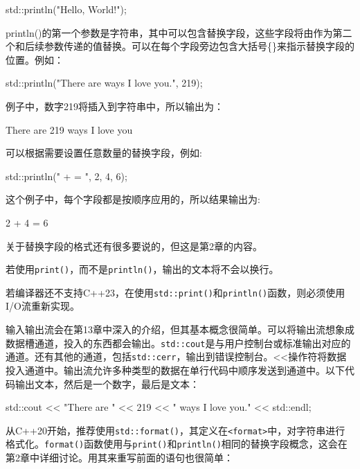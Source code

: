 \begin{cpp}
std::println("Hello, World!");
\end{cpp}

println()的第一个参数是字符串，其中可以包含替换字段，这些字段将由作为第二个和后续参数传递的值替换。可以在每个字段旁边包含大括号\{\}来指示替换字段的位置。例如：

\begin{cpp}
std::println("There are {} ways I love you.", 219);
\end{cpp}

例子中，数字219将插入到字符串中，所以输出为：

\begin{shell}
There are 219 ways I love you
\end{shell}

可以根据需要设置任意数量的替换字段，例如:

\begin{cpp}
std::println("{} + {} = {}", 2, 4, 6);
\end{cpp}

这个例子中，每个字段都是按顺序应用的，所以结果输出为:

\begin{shell}
2 + 4 = 6
\end{shell}

关于替换字段的格式还有很多要说的，但这是第2章的内容。

若使用\verb|print()|，而不是\verb|println()|，输出的文本将不会以换行。


若编译器还不支持C++23，在使用\verb|std::print()|和\verb|println()|函数，则必须使用I/O流重新实现。

输入输出流会在第13章中深入的介绍，但其基本概念很简单。可以将输出流想象成数据槽通道，投入的东西都会输出。\verb|std::cout|是与用户控制台或标准输出对应的通道。还有其他的通道，包括\verb|std::cerr|，输出到错误控制台。<{}<操作符将数据投入通道中。输出流允许多种类型的数据在单行代码中顺序发送到通道中。以下代码输出文本，然后是一个数字，最后是文本：

\begin{cpp}
std::cout << "There are " << 219 << " ways I love you." << std::endl;
\end{cpp}

从C++20开始，推荐使用\verb|std::format()|，其定义在\verb|<format>|中，对字符串进行格式化。\verb|format()|函数使用与\verb|print()|和\verb|println()|相同的替换字段概念，这会在第2章中详细讨论。用其来重写前面的语句也很简单：

